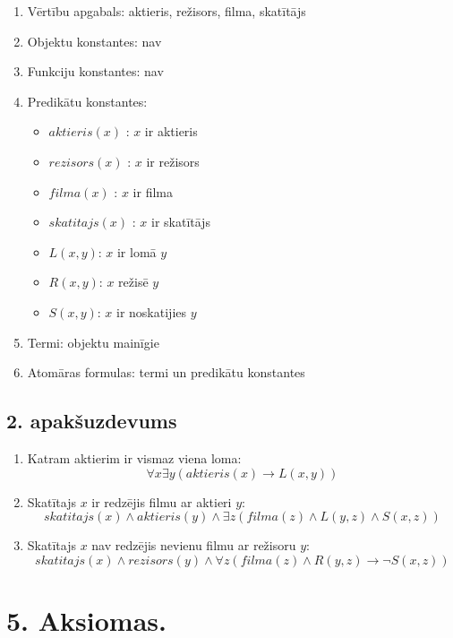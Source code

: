 \documentclass{article}
\begin{document}
\begin{enumerate}
    \item Vērtību apgabals: aktieris, režisors, filma, skatītājs
    \item Objektu konstantes: nav
    \item Funkciju konstantes: nav
    \item Predikātu konstantes:
          \begin{itemize}
              \item $ aktieris(x) $ : $ x $ ir aktieris
              \item $ rezisors(x) $ : $ x $ ir režisors
              \item $ filma(x) $ : $ x $ ir filma
              \item $ skatitajs(x) $ : $ x $ ir skatītājs
              \item $ L(x,y) $: $ x $ ir lomā $ y $
              \item $ R(x,y) $: $ x $ režisē $ y $
              \item $ S(x,y) $: $ x $ ir noskatijies $ y $
          \end{itemize}
    \item Termi: objektu mainīgie
    \item Atomāras formulas: termi un predikātu konstantes
\end{enumerate}

\subsection*{2. apakšuzdevums}

\begin{enumerate}
    \item Katram aktierim ir vismaz viena loma:
          \[
              \forall x \exists y (aktieris(x) \rightarrow L(x, y))
          \]

    \item Skatītajs $x$ ir redzējis filmu ar aktieri $y$:
          \[
              skatitajs(x) \land aktieris(y) \land \exists z(filma(z) \land L(y, z) \land S(x, z))
          \]

    \item Skatītajs $x$ nav redzējis nevienu filmu ar režisoru $y$:
          \[
            skatitajs(x) \land rezisors(y) \land \forall z (filma(z) \land R(y, z) \rightarrow \neg S(x, z))
          \]
\end{enumerate}


\pagebreak
\section*{5. Aksiomas.}
\end{document}
